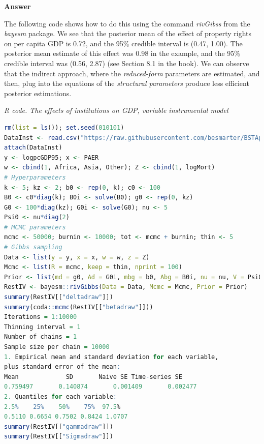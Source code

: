 \begin{enumerate}[leftmargin=*]
\textbf{Answer}

The following code shows how to do this using the command \textit{rivGibss} from the \textit{bayesm} package. We see that the posterior mean of the effect of property rights on per capita GDP is 0.72, and the 95\% credible interval is (0.47, 1.00). The posterior mean estimate of this effect was 0.98 in the example, and the 95\% credible interval was (0.56, 2.87) (see Section 8.1 in the book). We can observe that the indirect approach, where the \textit{reduced-form} parameters are estimated, and then, plug into the equations of the \textit{structural parameters} produce less efficient posterior estimations. 

\begin{tcolorbox}[enhanced,width=4.67in,center upper,
	fontupper=\large\bfseries,drop shadow southwest,sharp corners]
	\textit{R code. The effects of institutions on GDP, variable instrumental model}
	\begin{VF}
		\begin{lstlisting}[language=R]
rm(list = ls()); set.seed(010101)
DataInst <- read.csv("https://raw.githubusercontent.com/besmarter/BSTApp/refs/heads/master/DataApp/6Institutions.csv", sep = ",", header = TRUE, quote = "")
attach(DataInst)
y <- logpcGDP95; x <- PAER
w <- cbind(1, Africa, Asia, Other); Z <- cbind(1, logMort)
# Hyperparameters
k <- 5; kz <- 2; b0 <- rep(0, k); c0 <- 100
B0 <- c0*diag(k); B0i <- solve(B0); g0 <- rep(0, kz)
G0 <- 100*diag(kz); G0i <- solve(G0); nu <- 5
Psi0 <- nu*diag(2)
# MCMC parameters
mcmc <- 50000; burnin <- 10000; tot <- mcmc + burnin; thin <- 5
# Gibbs sampling
Data <- list(y = y, x = x, w = w, z = Z)
Mcmc <- list(R = mcmc, keep = thin, nprint = 100)
Prior <- list(md = g0, Ad = G0i, mbg = b0, Abg = B0i, nu = nu, V = Psi0)
RestIV <- bayesm::rivGibbs(Data = Data, Mcmc = Mcmc, Prior = Prior)
summary(RestIV[["deltadraw"]])
summary(coda::mcmc(RestIV[["betadraw"]]))
Iterations = 1:10000
Thinning interval = 1 
Number of chains = 1 
Sample size per chain = 10000 
1. Empirical mean and standard deviation for each variable,
plus standard error of the mean:
Mean             SD       Naive SE Time-series SE 
0.759497       0.140874       0.001409       0.002477 
2. Quantiles for each variable:
2.5%    25%    50%    75%  97.5% 
0.5110 0.6654 0.7502 0.8424 1.0707 
summary(RestIV[["gammadraw"]])
summary(RestIV[["Sigmadraw"]])
\end{lstlisting}
	\end{VF}
\end{tcolorbox}


\end{enumerate}

